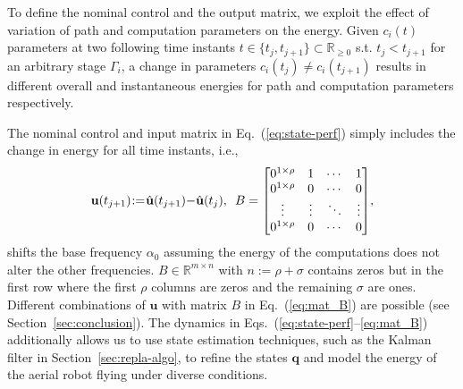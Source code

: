 \documentclass[letterpaper,10pt,journal,twoside]{IEEEtran}
\theoremstyle{definition}
\newtheorem{lem}[thm]{Lemma}
\begin{document}

To define the nominal control and the output matrix, we exploit the effect of variation of path and computation parameters on the energy. 
  Given $c_i(t)$ parameters at two following time instants $t\in\{t_j,t_{j+1}\}\subset\mathbb{R}_{\geq 0}$ s.t. $t_j<t_{j+1}$ for an arbitrary stage $\Gamma_i$, a change in parameters $c_i(t_j)\neq c_i(t_{j+1})$ results in different overall and instantaneous energies for path and computation parameters respectively.


%
The nominal control and input matrix in Eq.~(\ref{eq:state-perf}) simply includes the change in energy for all time instants, i.e.,
\begin{equation}\label{eq:mat_B}{\small
  \mathbf{u}(t_{j+1})\hspace*{-.5ex}:=\hspace*{-.5ex}\hat{\mathbf{u}}(t_{j+1})\hspace*{-.5ex}-\hspace*{-.5ex}\hat{\mathbf{u}}(t_j),\,\,\,B=\begin{bmatrix}
      0^{1\times\rho} & 1      & \cdots & 1      \\
      0^{1\times\rho} & 0      & \cdots & 0      \\ 
      \vdots          & \vdots & \ddots & \vdots \\
      0^{1\times\rho} & 0      & \cdots & 0   
  \end{bmatrix}},
\end{equation}
shifts the base frequency $\alpha_0$ assuming the energy of the computations does not alter the other frequencies. $B\in\mathbb{R}^{m\times n}$ with $n:=\rho+\sigma$ contains zeros but in the first row where the first $\rho$ columns are zeros and the remaining $\sigma$ are ones. Different combinations of $\mathbf{u}$ with matrix $B$ in Eq.~(\ref{eq:mat_B}) are possible %
{\color{blue}(see }Section~\ref{sec:conclusion}{\color{blue})}.
The dynamics in Eqs.~(\ref{eq:state-perf}--\ref{eq:mat_B}) additionally allows us to use state estimation techniques, such as the Kalman filter in Section~\ref{sec:repla-algo}, to refine the states $\mathbf{q}$ and model the energy of the aerial robot flying under diverse %
conditions.
\end{document}
